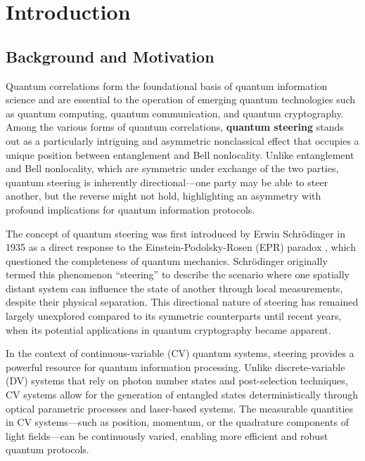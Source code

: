 
\chapter{Introduction}
\label{chp1}
\newpage

\section{Background and Motivation}

Quantum correlations form the foundational basis of quantum information science and are essential to the operation of emerging quantum technologies such as quantum computing, quantum communication, and quantum cryptography. Among the various forms of quantum correlations, \textbf{quantum steering} stands out as a particularly intriguing and asymmetric nonclassical effect that occupies a unique position between entanglement and Bell nonlocality. Unlike entanglement and Bell nonlocality, which are symmetric under exchange of the two parties, quantum steering is inherently directional—one party may be able to steer another, but the reverse might not hold, highlighting an asymmetry with profound implications for quantum information protocols.

The concept of quantum steering was first introduced by Erwin Schrödinger in 1935 as a direct response to the Einstein-Podolsky-Rosen (EPR) paradox \cite{SchrodingerE35}, which questioned the completeness of quantum mechanics. Schrödinger originally termed this phenomenon ``steering'' to describe the scenario where one spatially distant system can influence the state of another through local measurements, despite their physical separation. This directional nature of steering has remained largely unexplored compared to its symmetric counterparts until recent years, when its potential applications in quantum cryptography became apparent.

In the context of continuous-variable (CV) quantum systems, steering provides a powerful resource for quantum information processing. Unlike discrete-variable (DV) systems that rely on photon number states and post-selection techniques, CV systems allow for the generation of entangled states deterministically through optical parametric processes and laser-based systems. The measurable quantities in CV systems—such as position, momentum, or the quadrature components of light fields—can be continuously varied, enabling more efficient and robust quantum protocols.

